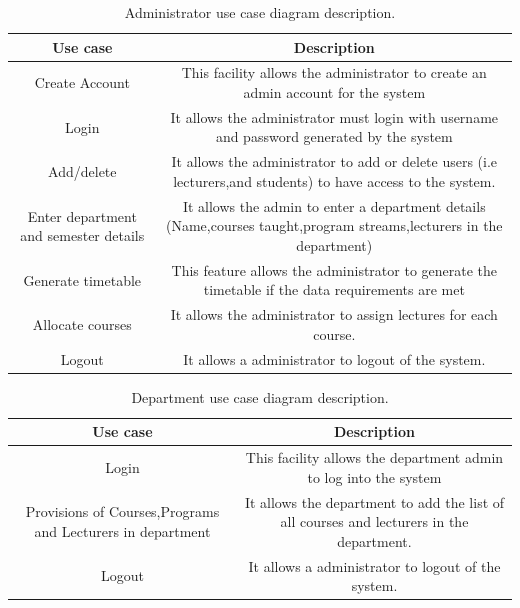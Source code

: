 \documentclass{scrreprt}
\begin{document}
\begin{table}[h!]
  \begin{center}
    \caption{ Administrator use case diagram description.}
    \label{tab:table1}
    \begin{tabular}{|c|c|} 
\hline
      \textbf{Use case} & \textbf{Description} \\
 
      \hline
Create Account&This facility allows the administrator to create an admin account for the system\\
\hline
     Login& It allows the administrator must login with username and password generated by the system \\
\hline
      Add/delete  &  It allows the administrator to add or delete  users (i.e lecturers,and students) to have access  to the system.\\
\hline
Enter department and semester details& It allows the admin to enter a department details (Name,courses taught,program streams,lecturers in the department)\\
\hline
Generate timetable& This  feature allows the administrator to generate the timetable if the data requirements are met\\
\hline
       Allocate courses & It allows the administrator to assign lectures for each course.\\
 \hline
Logout&  It allows a administrator to logout of the system.\\
\hline
  \end{tabular}
  \end{center}
\end{table}

\begin{table}[h!]
  \begin{center}
    \caption{ Department use case diagram description.}
    \label{tab:table1}
    \begin{tabular}{|c|c|} 
\hline \textbf{Use case} & \textbf{Description} \\
 \hline
Login &This facility allows the department admin to log into the system\\
\hline
   Provisions of Courses,Programs and Lecturers in department& It allows the department  to add  the list of all courses and lecturers in the department.\\
\hline Logout&  It allows a administrator to logout of the system.\\ \hline
  \end{tabular}
  \end{center}
\end{table}
\end{document}
